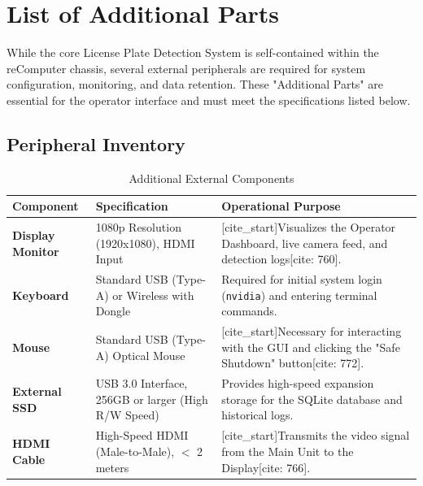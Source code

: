 %
%

\chapter{List of Additional Parts}

While the core License Plate Detection System is self-contained within the reComputer chassis, several external peripherals are required for system configuration, monitoring, and data retention. These "Additional Parts" are essential for the operator interface and must meet the specifications listed below.

\section{Peripheral Inventory}

\begin{table}[H]
	\centering
	\caption{Additional External Components}
	\label{tab:additional_parts}
	\begin{tabular}{|L{3.5cm}|L{5.5cm}|L{5.0cm}|}
		\hline
		\textbf{Component} & \textbf{Specification} & \textbf{Operational Purpose} \\ \hline
		
		\textbf{Display Monitor} & 
		1080p Resolution (1920x1080), HDMI Input & 
		[cite_start]Visualizes the Operator Dashboard, live camera feed, and detection logs[cite: 760]. \\ \hline
		
		\textbf{Keyboard} & 
		Standard USB (Type-A) or Wireless with Dongle & 
		Required for initial system login (\texttt{nvidia}) and entering terminal commands. \\ \hline
		
		\textbf{Mouse} & 
		Standard USB (Type-A) Optical Mouse & 
		[cite_start]Necessary for interacting with the GUI and clicking the "Safe Shutdown" button[cite: 772]. \\ \hline
		
		\textbf{External SSD} & 
		USB 3.0 Interface, 256GB or larger (High R/W Speed) & 
		Provides high-speed expansion storage for the SQLite database and historical logs. \\ \hline
		
		\textbf{HDMI Cable} & 
		High-Speed HDMI (Male-to-Male), $<$ 2 meters & 
		[cite_start]Transmits the video signal from the Main Unit to the Display[cite: 766]. \\ \hline
	\end{tabular}
\end{table}

